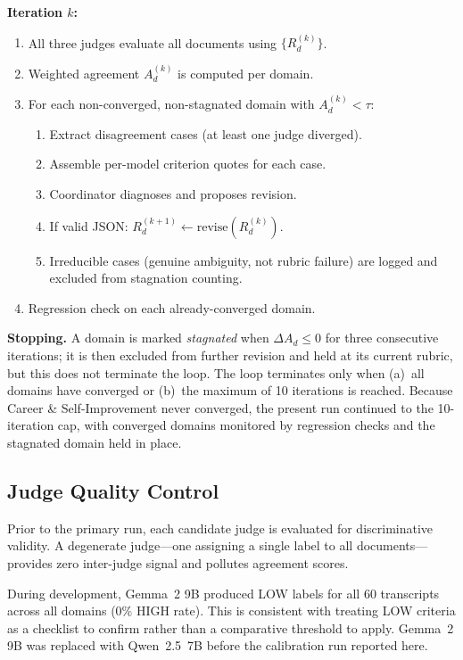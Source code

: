 \documentclass[11pt]{article}
\begin{document}
\textbf{Iteration $k$:}
\begin{enumerate}[leftmargin=*, noitemsep]
  \item All three judges evaluate all documents using $\{R_d^{(k)}\}$.
  \item Weighted agreement $A_d^{(k)}$ is computed per domain.
  \item For each non-converged, non-stagnated domain with $A_d^{(k)} < \tau$:
    \begin{enumerate}[label=\alph*., noitemsep]
      \item Extract disagreement cases (at least one judge diverged).
      \item Assemble per-model criterion quotes for each case.
      \item Coordinator diagnoses and proposes revision.
      \item If valid JSON: $R_d^{(k+1)} \leftarrow \mathrm{revise}(R_d^{(k)})$.
      \item Irreducible cases (genuine ambiguity, not rubric failure) are logged
            and excluded from stagnation counting.
    \end{enumerate}
  \item Regression check on each already-converged domain.
\end{enumerate}

\textbf{Stopping.} A domain is marked \emph{stagnated} when $\Delta A_d \leq 0$ for three
consecutive iterations; it is then excluded from further revision and held at its current
rubric, but this does not terminate the loop. The loop terminates only when (a)~all domains
have converged or (b)~the maximum of 10 iterations is reached. Because Career \&
Self-Improvement never converged, the present run continued to the 10-iteration cap, with
converged domains monitored by regression checks and the stagnated domain held in place.

\subsection{Judge Quality Control}
\label{sec:judgeqc}

Prior to the primary run, each candidate judge is evaluated for discriminative
validity. A degenerate judge---one assigning a single label to all
documents---provides zero inter-judge signal and pollutes agreement scores.

During development, Gemma~2 9B produced LOW labels for all 60 transcripts
across all domains (0\% HIGH rate). This is consistent with treating LOW
criteria as a checklist to confirm rather than a comparative threshold to apply.
Gemma~2 9B was replaced with Qwen~2.5~7B before the calibration run reported here.
\end{document}
